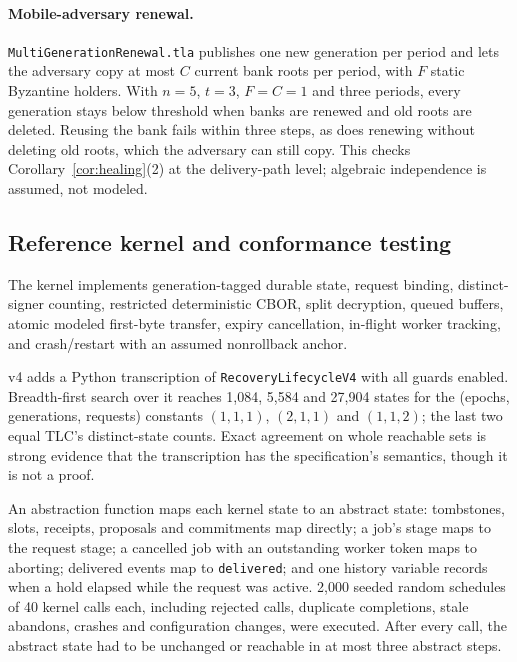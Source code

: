 \documentclass[pdflatex,sn-mathphys-num]{sn-jnl}
\theoremstyle{plain}
\theoremstyle{definition}
\newcommand{\code}[1]{\texttt{#1}}
\begin{document}
\paragraph{Mobile-adversary renewal.}
\code{MultiGenerationRenewal.tla} publishes one new generation per period and lets the adversary copy at most $C$ current bank roots per period, with $F$ static Byzantine holders. With $n=5$, $t=3$, $F=C=1$ and three periods, every generation stays below threshold when banks are renewed and old roots are deleted. Reusing the bank fails within three steps, as does renewing without deleting old roots, which the adversary can still copy. This checks Corollary~\ref{cor:healing}(2) at the delivery-path level; algebraic independence is assumed, not modeled.

\subsection{Reference kernel and conformance testing}
The kernel implements generation-tagged durable state, request binding, distinct-signer counting, restricted deterministic CBOR, split decryption, queued buffers, atomic modeled first-byte transfer, expiry cancellation, in-flight worker tracking, and crash/restart with an assumed nonrollback anchor.

v4 adds a Python transcription of \code{RecoveryLifecycleV4} with all guards enabled. Breadth-first search over it reaches 1,084, 5,584 and 27,904 states for the (epochs, generations, requests) constants $(1,1,1)$, $(2,1,1)$ and $(1,1,2)$; the last two equal TLC's distinct-state counts. Exact agreement on whole reachable sets is strong evidence that the transcription has the specification's semantics, though it is not a proof.

An abstraction function maps each kernel state to an abstract state: tombstones, slots, receipts, proposals and commitments map directly; a job's stage maps to the request stage; a cancelled job with an outstanding worker token maps to aborting; delivered events map to \code{delivered}; and one history variable records when a hold elapsed while the request was active. 2,000 seeded random schedules of 40 kernel calls each, including rejected calls, duplicate completions, stale abandons, crashes and configuration changes, were executed. After every call, the abstract state had to be unchanged or reachable in at most three abstract steps.
\end{document}

